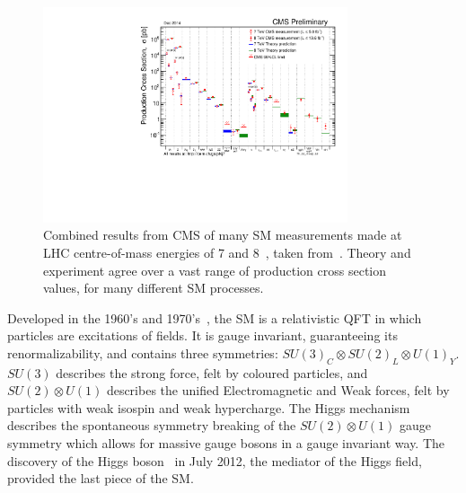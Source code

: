 \begin{figure}[htbp]
  \begin{center}
  \includegraphics[width=0.8\textwidth]{Figures/theory/SigmaNew_v0}
  \caption{Combined results from \ac{CMS} of many \ac{SM} measurements made at \ac{LHC} centre-of-mass energies of 7 and 8~\TeV, taken from~\cite{CMSpublictwiki}. Theory and experiment agree over a vast range of production cross section values, for many different \ac{SM} processes.
}
  \label{fig:stairwayToHeaven}
  \end{center}
\end{figure}

Developed in the 1960's and 1970's~\cite{PhysRevLett.19.1264,Glashow:1961tr,Salam:1968rm,Hooft1971167}, the \ac{SM} is a relativistic \ac{QFT} in which particles are excitations of fields. 
It is gauge invariant, guaranteeing its renormalizability, and contains three symmetries:
$SU(3)_{C} \otimes SU(2)_{L} \otimes U(1)_{Y}$.
$SU(3)$ describes the strong force, felt by coloured particles, 
and $SU(2) \otimes U(1)$ describes the unified Electromagnetic and Weak forces, felt by particles with weak isospin and weak hypercharge. 
The Higgs mechanism~\cite{Higgs1964132,PhysRevLett.13.321,PhysRevLett.13.508,PhysRevLett.13.585,PhysRev.145.1156,PhysRev.155.1554} describes the spontaneous symmetry breaking of the $SU(2) \otimes U(1)$ gauge symmetry which allows for massive gauge bosons in a gauge invariant way.
The discovery of the Higgs boson~\cite{Aad:2012tfa,Chatrchyan:2012ufa} in July 2012, the mediator of the Higgs field, provided the last piece of the \ac{SM}. 


